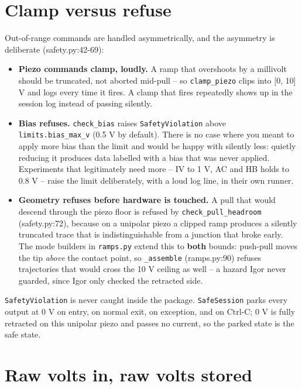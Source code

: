 \section{Clamp versus refuse}

Out-of-range commands are handled asymmetrically, and the asymmetry is deliberate (safety.py:42-69):

\begin{itemize}[leftmargin=*]
\item \textbf{Piezo commands clamp, loudly.} A ramp that overshoots by a millivolt should be truncated, not aborted mid-pull -- so \texttt{clamp\_\discretionary{}{}{}piezo} clips into [0, 10] V and logs every time it fires. A clamp that fires repeatedly shows up in the session log instead of passing silently.
\item \textbf{Bias refuses.} \texttt{check\_\discretionary{}{}{}bias} raises \texttt{Safety\discretionary{}{}{}Violation} above \texttt{limits.\discretionary{}{}{}bias\_\discretionary{}{}{}max\_\discretionary{}{}{}v} (0.5 V by default). There is no case where you meant to apply more bias than the limit and would be happy with silently less: quietly reducing it produces data labelled with a bias that was never applied. Experiments that legitimately need more -- IV to 1 V, AC and HB holds to 0.8 V -- raise the limit deliberately, with a loud log line, in their own runner.
\item \textbf{Geometry refuses before hardware is touched.} A pull that would descend through the piezo floor is refused by \texttt{check\_\discretionary{}{}{}pull\_\discretionary{}{}{}headroom} (safety.py:72), because on a unipolar piezo a clipped ramp produces a silently truncated trace that is indistinguishable from a junction that broke early. The mode builders in \texttt{ramps.\discretionary{}{}{}py} extend this to \textbf{both} bounds: push-pull moves the tip \emph{above} the contact point, so \texttt{\_\discretionary{}{}{}assemble} (ramps.py:90) refuses trajectories that would cross the 10 V ceiling as well -- a hazard Igor never guarded, since Igor only checked the retracted side.
\end{itemize}

\texttt{Safety\discretionary{}{}{}Violation} is never caught inside the package. \texttt{Safe\discretionary{}{}{}Session} parks every output at 0 V on entry, on normal exit, on exception, and on Ctrl-C; 0 V is fully retracted on this unipolar piezo and passes no current, so the parked state is the safe state.

\section{Raw volts in, raw volts stored}

